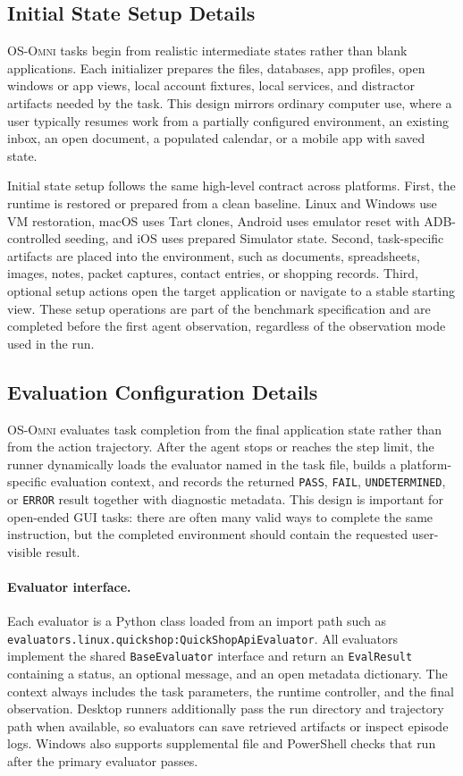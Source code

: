 \subsection{Initial State Setup Details}
\label{app:benchmark_initial_state_setup}
\textsc{OS-Omni} tasks begin from realistic intermediate states rather than blank applications. Each initializer prepares the files, databases, app profiles, open windows or app views, local account fixtures, local services, and distractor artifacts needed by the task. This design mirrors ordinary computer use, where a user typically resumes work from a partially configured environment, an existing inbox, an open document, a populated calendar, or a mobile app with saved state.

Initial state setup follows the same high-level contract across platforms. First, the runtime is restored or prepared from a clean baseline. Linux and Windows use VM restoration, macOS uses Tart clones, Android uses emulator reset with ADB-controlled seeding, and iOS uses prepared Simulator state. Second, task-specific artifacts are placed into the environment, such as documents, spreadsheets, images, notes, packet captures, contact entries, or shopping records. Third, optional setup actions open the target application or navigate to a stable starting view. These setup operations are part of the benchmark specification and are completed before the first agent observation, regardless of the observation mode used in the run.

\subsection{Evaluation Configuration Details}
\label{app:benchmark_evaluation_configuration}
\textsc{OS-Omni} evaluates task completion from the final application state rather than from the action trajectory. After the agent stops or reaches the step limit, the runner dynamically loads the evaluator named in the task file, builds a platform-specific evaluation context, and records the returned \texttt{PASS}, \texttt{FAIL}, \texttt{UNDETERMINED}, or \texttt{ERROR} result together with diagnostic metadata. This design is important for open-ended GUI tasks: there are often many valid ways to complete the same instruction, but the completed environment should contain the requested user-visible result.

\paragraph{Evaluator interface.}
Each evaluator is a Python class loaded from an import path such as \texttt{evaluators.linux.quickshop:QuickShopApiEvaluator}. All evaluators implement the shared \texttt{BaseEvaluator} interface and return an \texttt{EvalResult} containing a status, an optional message, and an open metadata dictionary. The context always includes the task parameters, the runtime controller, and the final observation. Desktop runners additionally pass the run directory and trajectory path when available, so evaluators can save retrieved artifacts or inspect episode logs. Windows also supports supplemental file and PowerShell checks that run after the primary evaluator passes.

